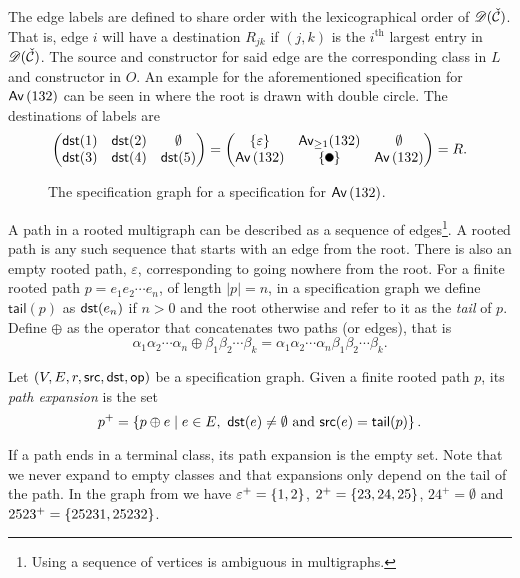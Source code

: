 The edge labels are defined to share order with the lexicographical order of $\mathscr{D}(\check{\mathcal{C}})$. That is, edge $i$ will have a destination $R_{jk}$ if $(j,k)$ is the $i^\text{th}$ largest entry in $\mathscr{D}(\check{\mathcal{C}})$. The source and constructor for said edge are the corresponding class in $L$ and constructor in $O$. An example for the aforementioned specification for $\textsf{Av}\left(132\right)$ can be seen in  where the root is drawn with double circle. The destinations of labels are
\[
    \begin{pmatrix}
        \dst(1) & \dst(2) & \emptyset\\
        \dst(3) & \dst(4) & \dst(5)
    \end{pmatrix}
    =
    \begin{pmatrix}
    \set{\varepsilon} & \textsf{Av}_{\geq1}(132) & \emptyset \\
    \Av{132} & \set{\point{0.1}} & \Av{132}
    \end{pmatrix}
    = R.
\]

\begin{figure}[ht!]
    \centering
    
    \caption{The specification graph for a specification for $\textsf{Av}\left(132\right)$.}
    \label{fig:specgraph132}
\end{figure}

A path in a rooted multigraph can be described as a sequence of edges\footnote{Using a sequence of vertices is ambiguous in multigraphs.}. A rooted path is any such sequence that starts with an edge from the root. There is also an empty rooted path, $\varepsilon$, corresponding to going nowhere from the root. For a finite rooted path $p=e_1e_2\dotsm e_n$, of length $|p|=n$, in a specification graph we define $\textsf{tail}(p)$ as $\textsf{dst}(e_n)$ if $n>0$ and the root otherwise and refer to it as the \emph{tail} of $p$. Define $\oplus$ as the operator that concatenates two paths (or edges), that is
\[
    \alpha_1\alpha_2 \dotsm \alpha_n \oplus \beta_1\beta_2 \dotsm \beta_k = \alpha_1\alpha_2 \dotsm \alpha_n\beta_1\beta_2 \dotsm \beta_k.
\]

\begin{definition}
Let $(V,E,r,\textsf{src},\textsf{dst},\textsf{op})$ be a specification graph. Given a finite rooted path $p$, its \emph{path expansion} is the set 
\[
    p^+ = \left\{p \oplus e \mid e \in E, \ \textsf{dst}(e) \neq \emptyset \text{ and } \textsf{src}(e) = \textsf{tail}(p)\right\}.
\]
\end{definition}
If a path ends in a terminal class, its path expansion is the empty set. Note that we never expand to empty classes and that expansions only depend on the tail of the path. In the graph from  we have $\varepsilon^+ = \left\{1,2\right\}$, $2^+ = \left\{23,24,25\right\}$, $24^+ = \emptyset$ and $2523^+ = \left\{25231, 25232\right\}$.


